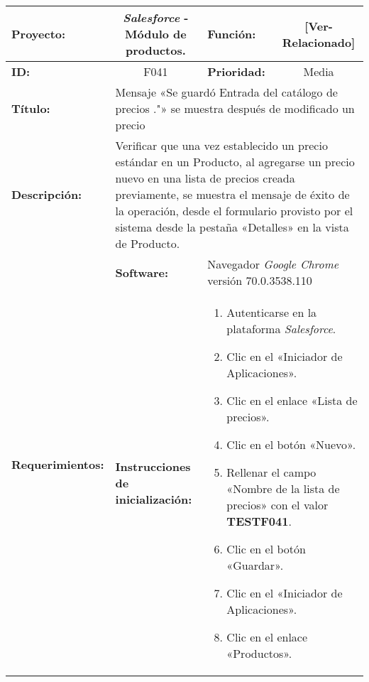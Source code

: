 \begin{table}
\renewcommand{\arraystretch}{1}
\linespread{1}
\centering
\begin{tabular}{|p{2.5cm}|p{2.8cm}|p{2.2cm}|p{2.8cm}|p{2.2cm}|}
\hline
\footnotesize{\textbf{Proyecto:}} &
\multicolumn{2}{c|}{\footnotesize{\emph{Salesforce} - Módulo de productos.}} &
\footnotesize{\textbf{Función:}} &
\multicolumn{1}{c|}{\footnotesize{[Ver-Relacionado]}} \\
\hline
\footnotesize{\textbf{ID:}} & \multicolumn{2}{c|}{\footnotesize{F041}} &
\footnotesize{\textbf{Prioridad:}} &
\multicolumn{1}{c|}{\footnotesize{Media}} \\
\hline
\footnotesize{\textbf{Título:}} &
\multicolumn{4}{p{12.4cm}|}{\footnotesize{Mensaje «Se guardó Entrada del
catálogo de precios ."» se muestra después de modificado un precio}} \\
\hline
\footnotesize{\textbf{Descripción:}} &
\multicolumn{4}{p{12.4cm}|}{\footnotesize{Verificar que una vez establecido un
precio estándar en un Producto, al agregarse un precio nuevo en una lista de
precios creada previamente, se muestra el mensaje de éxito de la operación,
desde el formulario provisto por el sistema desde la pestaña «Detalles» en la
vista de Producto.}} \\
\hline
\multirow{2}{*}{\footnotesize{\textbf{Requerimientos:}}} &
\footnotesize{\textbf{Software:}} &
\multicolumn{3}{p{7.8cm}|}{\footnotesize{Navegador \emph{Google Chrome}
versión 70.0.3538.110}} \\
\cline{2-5}
& \footnotesize{\textbf{Instrucciones de inicialización:}} &
\multicolumn{3}{p{7.8cm}|}{\footnotesize{
\vspace{-3mm}
\begin{enumerate}
\item Autenticarse en la plataforma \emph{Salesforce}.
\item Clic en el «Iniciador de Aplicaciones».
\item Clic en el enlace «Lista de precios».
\item Clic en el botón «Nuevo».
\item Rellenar el campo «Nombre de la lista de precios» con el valor
    \textbf{TESTF041}.
\item Clic en el botón «Guardar».
\item Clic en el «Iniciador de Aplicaciones».
\item Clic en el enlace «Productos».
\end{enumerate}
\vspace{-5mm}
}}
\end{tabular}
\end{table}
